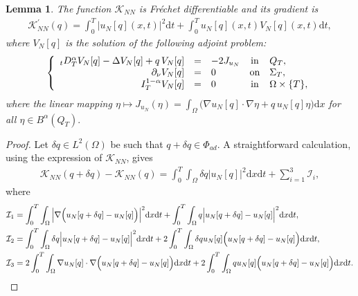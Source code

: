 \documentclass[a4paper,12pt,reqno,natbib]{amsart}
\newtheorem{lemma}[theorem]{Lemma}
\newcommand{\dx} {\displaystyle\mathrm{d}x}
\newcommand{\dt} {\displaystyle\mathrm{d}t}
\begin{document}
{\begin{lemma}\label{lemm1}
The function $\mathcal{K}_{NN}$ is Fr\'echet differentiable and its gradient is
\begin{align} \label{frechlet_N}
    \mathcal{K}_{NN}^{\prime}(q)= \int_{0}^T \Big| u_N[q](x,t)\Big|^2 \dt +\int_{0}^T   u_N[q](x,t) V_N[q](x,t)\dt,
\end{align}
where $V_N[q]$ is the solution of the following adjoint problem:
\begin{eqnarray}\label{adjoint}
 \left\{
   \begin{array}{rclcl}
      {}_tD^{\alpha}_T V_N[q]-\Delta  V_N[q] +q\, V_N[q] &=&-2 J_{u_N} & \hbox{in} & Q_T, \\
 \partial_\nu V_N[q]&=&0 &\hbox{on} & \Sigma_T,\\
 I^{1-\alpha}_{T}V_N[q]&=&0 &\hbox{in} & \Omega\times\{T\},
   \end{array}
 \right.
 \end{eqnarray}
where the linear mapping $\eta\longmapsto J_{u_N}(\eta)=\displaystyle\int_\Omega\Big(\nabla u_N[q]\cdot\nabla \eta+q\,u_N[q]\eta\Big)\dx$ for all $\eta\in B^\alpha(Q_T).$
\end{lemma}



\begin{proof}
Let $\delta q\in L^2(\Omega)$ be such that $q+\delta q \in \Phi_{ad}$.
A straightforward calculation, using the expression of $\mathcal{K}_{NN}$, gives
\begin{align} \label{m}
    \mathcal{K}_{NN}(q+\delta q) - \mathcal{K}_{NN}(q) =\int_0^T\int_{\Omega}\delta q \Big| u_N[q]\Big|^2 \dx \dt+\sum_{i=1}^3\mathcal{I}_i,
\end{align}
where
\begin{align} 
    \notag
    \mathcal{I}_1&= \int_0^T\int_{\Omega} \Big|\nabla\Big( u_N[q+\delta q]- u_N[q]\Big)\Big|^2\dx\dt +\int_0^T\int_{\Omega} q\Big|  u_N[q+\delta q]- u_N[q]\Big|^2\dx\dt,\\
    \notag
    \mathcal{I}_2&=\int_0^T\int_{\Omega} \delta q\Big| u_N[q+\delta q]- u_N[q]\Big|^2\dx\dt + 2\int_0^T\int_{\Omega} \delta q u_N[q] \Big( u_N[q+\delta q]- u_N[q]\Big) \dx\dt,\\
        \notag
    \mathcal{I}_3&= 2\int_0^T\int_{\Omega} \nabla u_N[q] \cdot \nabla\Big( u_N[q+\delta q]- u_N[q]\Big) \dx\dt + 2\int_0^T\int_{\Omega} q u_N[q] \Big( u_N[q+\delta q]- u_N[q]\Big) \dx\dt.
\end{align}


\end{proof}}
\end{document}
